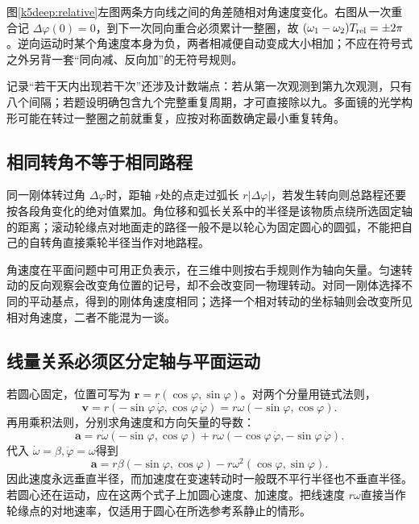 图\ref{k5deep:relative}左图两条方向线之间的角差随相对角速度变化。右图从一次重合记 $\Delta\varphi(0)=0$，到下一次同向重合必须累计一整圈，故 $(\omega_1-\omega_2)T_{\rm rel}=\pm2\pi$。逆向运动时某个角速度本身为负，两者相减便自动变成大小相加；不应在符号式之外另背一套“同向减、反向加”的无符号规则。

记录“若干天内出现若干次”还涉及计数端点：若从第一次观测到第九次观测，只有八个间隔；若题设明确包含九个完整重复周期，才可直接除以九。多面镜的光学构形可能在转过一整圈之前就重复，应按对称面数确定最小重复转角。

\subsection{相同转角不等于相同路程}
同一刚体转过角 $\Delta\varphi$时，距轴 $r$处的点走过弧长 $r|\Delta\varphi|$，若发生转向则总路程还要按各段角变化的绝对值累加。角位移和弧长关系中的半径是该物质点绕所选固定轴的距离；滚动轮缘点对地面走的路径一般不是以轮心为固定圆心的圆弧，不能把自己的自转角直接乘轮半径当作对地路程。

角速度在平面问题中可用正负表示，在三维中则按右手规则作为轴向矢量。匀速转动的反向观察会改变角位置的记号，却不会改变同一物理转动。对同一刚体选择不同的平动基点，得到的刚体角速度相同；选择一个相对转动的坐标轴则会改变所见相对角速度，二者不能混为一谈。

\subsection{线量关系必须区分定轴与平面运动}
若圆心固定，位置可写为 $\bm r=r(\cos\varphi,\sin\varphi)$。对两个分量用链式法则，
\[\bm v=r(-\sin\varphi\,\dot\varphi,\cos\varphi\,\dot\varphi)
 =r\omega(-\sin\varphi,\cos\varphi).\]
再用乘积法则，分别求角速度和方向矢量的导数：
\[\bm a=r\dot\omega(-\sin\varphi,\cos\varphi)
 +r\omega(-\cos\varphi\,\dot\varphi,-\sin\varphi\,\dot\varphi).\]
代入 $\dot\omega=\beta,\dot\varphi=\omega$得到
\[\bm a=r\beta(-\sin\varphi,\cos\varphi)-r\omega^2(\cos\varphi,\sin\varphi).
\]
因此速度永远垂直半径，而加速度在变速转动时一般既不平行半径也不垂直半径。若圆心还在运动，应在这两个式子上加圆心速度、加速度。把线速度 $r\omega$直接当作轮缘点的对地速率，仅适用于圆心在所选参考系静止的情形。


